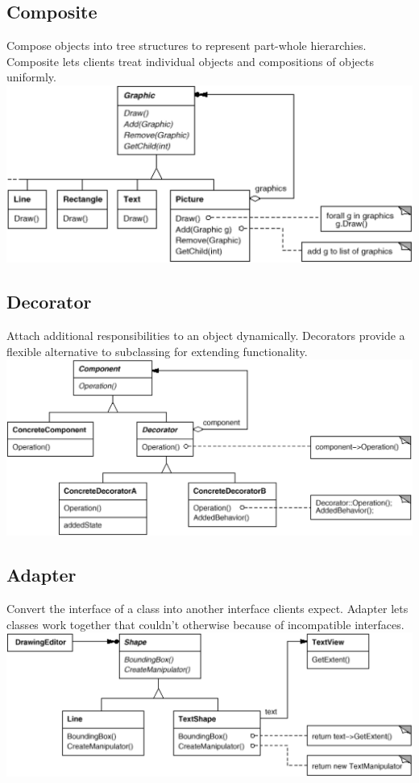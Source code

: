\subsection{Composite}
Compose objects into tree structures to represent part-whole hierarchies. Composite lets clients treat individual objects and compositions of objects uniformly.\\ 
\includegraphics[width=\linewidth]{./img/composite.png}


\subsection{Decorator}
Attach additional responsibilities to an object dynamically. Decorators provide a flexible alternative to subclassing for extending functionality.\\ 
\includegraphics[width=\linewidth]{./img/decorator.png}

\subsection{Adapter}
Convert the interface of a class into another interface clients expect. Adapter lets classes work together that couldn't otherwise because of incompatible interfaces.\\ 
\includegraphics[width=\linewidth]{./img/adapter.png}

